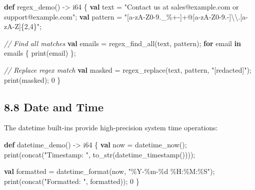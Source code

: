 \documentclass[
  english,
]{book}
\newenvironment{Shaded}{\begin{snugshade}}{\end{snugshade}}
\newcommand{\CommentTok}[1]{\textcolor[rgb]{0.42,0.60,0.33}{\textit{#1}}}
\newcommand{\ControlFlowTok}[1]{\textcolor[rgb]{0.77,0.53,0.75}{\textbf{#1}}}
\newcommand{\DataTypeTok}[1]{\textcolor[rgb]{0.31,0.79,0.69}{#1}}
\newcommand{\DecValTok}[1]{\textcolor[rgb]{0.71,0.81,0.66}{#1}}
\newcommand{\FunctionTok}[1]{\textcolor[rgb]{0.86,0.86,0.67}{#1}}
\newcommand{\KeywordTok}[1]{\textcolor[rgb]{0.34,0.61,0.84}{\textbf{#1}}}
\newcommand{\NormalTok}[1]{\textcolor[rgb]{0.83,0.83,0.83}{#1}}
\newcommand{\OperatorTok}[1]{\textcolor[rgb]{0.83,0.83,0.83}{#1}}
\newcommand{\StringTok}[1]{\textcolor[rgb]{0.81,0.57,0.47}{#1}}
\begin{document}
\begin{Shaded}
\begin{Highlighting}[]
\KeywordTok{def}\NormalTok{ regex\_demo() }\OperatorTok{{-}\textgreater{}} \DataTypeTok{i64}\NormalTok{ \{}
    \KeywordTok{val}\NormalTok{ text }\OperatorTok{=} \StringTok{"Contact us at sales@example.com or support@example.com"}\NormalTok{;}
    \KeywordTok{val}\NormalTok{ pattern }\OperatorTok{=} \StringTok{"[a{-}zA{-}Z0{-}9.\_\%+{-}]+@[a{-}zA{-}Z0{-}9.{-}]\textbackslash{}\textbackslash{}.[a{-}zA{-}Z]\{2,4\}"}\NormalTok{;}
    
    \CommentTok{// Find all matches}
    \KeywordTok{val}\NormalTok{ emails }\OperatorTok{=} \FunctionTok{regex\_find\_all}\NormalTok{(text, pattern);}
    \ControlFlowTok{for}\NormalTok{ email }\ControlFlowTok{in}\NormalTok{ emails \{}
        \FunctionTok{print}\NormalTok{(email)}
\NormalTok{    \};}
    
    \CommentTok{// Replace regex match}
    \KeywordTok{val}\NormalTok{ masked }\OperatorTok{=} \FunctionTok{regex\_replace}\NormalTok{(text, pattern, }\StringTok{"[redacted]"}\NormalTok{);}
    \FunctionTok{print}\NormalTok{(masked);}
    \DecValTok{0}
\NormalTok{\}}
\end{Highlighting}
\end{Shaded}

\subsection{8.8 Date and Time}\label{date-and-time}

The datetime built-ins provide high-precision system time operations:

\begin{Shaded}
\begin{Highlighting}[]
\KeywordTok{def}\NormalTok{ datetime\_demo() }\OperatorTok{{-}\textgreater{}} \DataTypeTok{i64}\NormalTok{ \{}
    \KeywordTok{val}\NormalTok{ now }\OperatorTok{=} \FunctionTok{datetime\_now}\NormalTok{();}
    \FunctionTok{print}\NormalTok{(}\FunctionTok{concat}\NormalTok{(}\StringTok{"Timestamp: "}\NormalTok{, }\FunctionTok{to\_str}\NormalTok{(}\FunctionTok{datetime\_timestamp}\NormalTok{())));}
    
    \KeywordTok{val}\NormalTok{ formatted }\OperatorTok{=} \FunctionTok{datetime\_format}\NormalTok{(now, }\StringTok{"\%Y{-}\%m{-}\%d \%H:\%M:\%S"}\NormalTok{);}
    \FunctionTok{print}\NormalTok{(}\FunctionTok{concat}\NormalTok{(}\StringTok{"Formatted: "}\NormalTok{, formatted));}
    \DecValTok{0}
\NormalTok{\}}
\end{Highlighting}
\end{Shaded}
\end{document}
